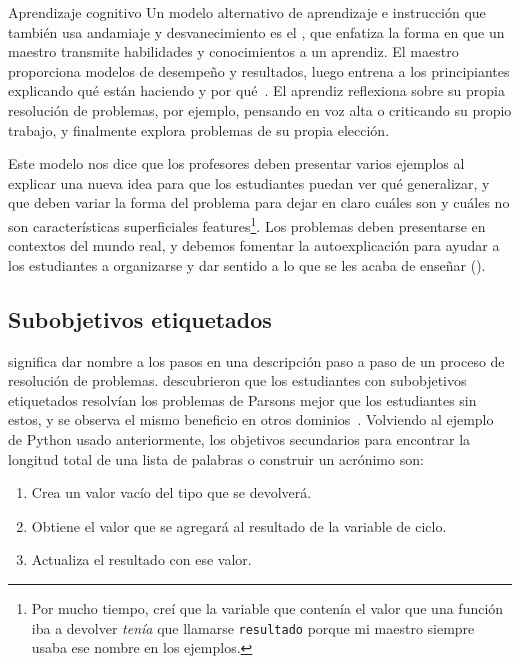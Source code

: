 \begin{aside}{Aprendizaje cognitivo}
  Un modelo alternativo de aprendizaje e instrucción que también usa andamiaje y desvanecimiento 
  es el , 
  que enfatiza la forma en que un maestro transmite habilidades y conocimientos a un aprendiz. 
  El maestro proporciona modelos de desempeño y resultados, 
  luego entrena a los principiantes explicando qué están haciendo y por qué~\cite{Coll1991,Casp2007}.
  El aprendiz reflexiona sobre su propia resolución de problemas, 
  por ejemplo, pensando en voz alta o criticando su propio trabajo, 
  y finalmente explora problemas de su propia elección.

  Este modelo nos dice que 
  los profesores deben presentar varios ejemplos al explicar una nueva idea 
  para que los estudiantes puedan ver qué generalizar, 
  y que deben variar la forma del problema para dejar en claro 
  cuáles son y cuáles no son características superficiales features\footnote{Por mucho tiempo,
     creí que la variable que contenía el valor que una función iba a devolver 
     \emph{tenía} que llamarse \texttt{resultado}
     porque mi maestro siempre usaba ese nombre en los ejemplos.}.    
  Los problemas deben presentarse en contextos del mundo real, 
  y debemos fomentar la autoexplicación para ayudar a los estudiantes 
  a organizarse y dar sentido a lo que se les acaba de enseñar 
 ().
\end{aside}


\subsection*{Subobjetivos etiquetados}
 
 significa 
dar nombre a los pasos en una descripción paso a paso de un proceso de resolución de problemas. 
\cite{Marg2016,Morr2016} descubrieron que los estudiantes con subobjetivos etiquetados 
resolvían los problemas de Parsons mejor que los estudiantes sin estos, 
y se observa el mismo beneficio en otros dominios~\cite{Marg2012}. 
Volviendo al ejemplo de Python usado anteriormente, 
los objetivos secundarios para encontrar la longitud total de una lista de palabras o construir un acrónimo son:

\begin{enumerate}

\item
  Crea un valor vacío del tipo que se devolverá.

\item
  Obtiene el valor que se agregará al resultado de la variable de ciclo.

\item
  Actualiza el resultado con ese valor.

\end{enumerate}


